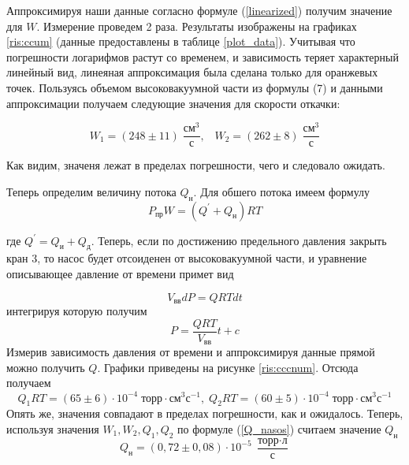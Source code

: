 \documentclass[a4paper, 12pt]{article}
\begin{document}
Аппроксимируя наши данные согласно формуле (\ref{linearized}) получим значение для $W$. Измерение проведем 2 раза. Результаты изображены на графиках \ref{ris:ccum} (данные предоставлены в таблице \ref{plot_data}). Учитывая что погрешности логарифмов растут со временем, и зависимость теряет характерный линейный вид, линеяная аппроксимация была сделана только для оранжевых точек. Пользуясь объемом высоковакуумной части из формулы (7) и данными аппроксимации получаем следующие значения для скорости откачки:


\begin{equation}
	W_1 = (248 \pm 11) \; \frac{\text{см}^3}{\text{с}}, \; \; \; W_2 = (262 \pm 8) \; \frac{\text{см}^3}{\text{с}}
	\label{W_znach}
\end{equation}

Как видим, значеня лежат в пределах погрешности, чего и следовало ожидать.

Теперь определим величину потока $Q_\text{н}$. Для обшего потока имеем формулу
\begin{equation}
	P_{\text{пр}}W = (Q^\prime + Q_\text{н})RT
	\label{Q_nasos}
\end{equation}

где $Q^\prime=Q_\text{и}+Q_\text{д}$. Теперь, если по достижению предельного давления закрыть кран 3, то насос будет отсоиденен от высоковакуумной части, и уравнение описывающее давление от времени примет вид

    \begin{equation*}
        V_{\text{вв}}dP = QRTdt
    \end{equation*}
    интегрируя которую получим
    \begin{equation}
        P = \frac{QRT}{V_{\text{вв}}}t + c
    \end{equation}
    Измерив зависимость давления от времени и аппроксимируя данные прямой можно получить $Q$. Графики приведены на рисунке \ref{ris:cccnum}. Отсюда получаем
    \begin{equation}
        Q_1RT=(65 \pm 6)\cdot 10^{-4} \; \text{торр}\cdot \text{см}^3\text{с}^{-1}, \; Q_2RT=(60 \pm 5)\cdot 10^{-4} \; \text{торр}\cdot\text{см}^3\text{с}^{-1}
    \end{equation}
    Опять же, значения совпадают в пределах погрешности, как и ожидалось. Теперь, используя значения $W_1, W_2, Q_1, Q_2$ по формуле (\ref{Q_nasos}) считаем значение $Q_{н}$
    \begin{equation}
        Q_\text{н}=(0,72 \pm 0,08)\cdot10^{-5} \; \frac{\text{торр} \cdot \text{л}}{\text{с}}
    \end{equation}
\end{document}
